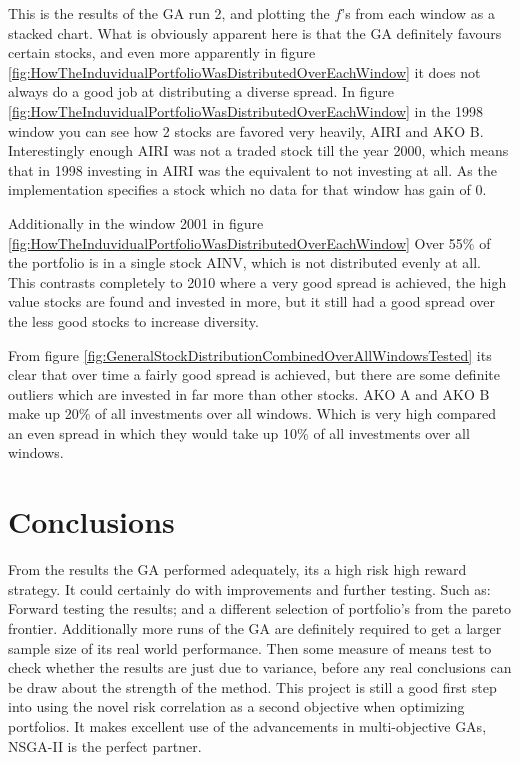 \documentclass[11pt]{article}
\begin{document}
    This is the results of the GA run 2, and plotting the \(f\)'s from each window as
    a stacked chart. What is obviously apparent here is that the GA definitely favours
    certain stocks, and even more apparently in figure
    \ref{fig:HowTheInduvidualPortfolioWasDistributedOverEachWindow} it does not always
    do a good job at distributing a diverse spread. In figure
    \ref{fig:HowTheInduvidualPortfolioWasDistributedOverEachWindow} in the 1998 window
    you can see how 2 stocks are favored very heavily, AIRI and AKO B. Interestingly
    enough AIRI was not a traded stock till the year 2000, which means that in 1998
    investing in AIRI was the equivalent to not investing at all. As the implementation
    specifies a stock which no data for that window has gain of 0.

    Additionally in the window 2001 in figure
    \ref{fig:HowTheInduvidualPortfolioWasDistributedOverEachWindow} Over 55\% of the portfolio
    is in a single stock AINV, which is not distributed evenly at all. This contrasts
    completely to 2010 where a very good spread is achieved, the high value stocks are found
    and invested in more, but it still had a good spread over the less good stocks to
    increase diversity.

    From figure \ref{fig:GeneralStockDistributionCombinedOverAllWindowsTested} its
    clear that over time a fairly good spread is achieved, but there are some definite
    outliers which are invested in far more than other stocks. AKO A and AKO B make up
    20\% of all investments over all windows. Which is very high compared an even spread
    in which they would take up 10\% of all investments over all windows.

\section{Conclusions}

    From the results the GA performed adequately, its a high risk
    high reward strategy. It could certainly do with improvements and further testing.
    Such as: Forward testing the results; and a different selection of portfolio's
    from the pareto frontier. Additionally more runs of the GA are definitely required
    to get a larger sample size of its real world performance. Then some measure of
    means test to check whether the results are just due to variance,
    before any real conclusions can be draw about the strength of the method. This
    project is still a good first step into using the novel risk correlation
    as a second objective when optimizing portfolios. It makes excellent use
    of the advancements in multi-objective GAs, NSGA-II is the perfect partner.
\end{document}
